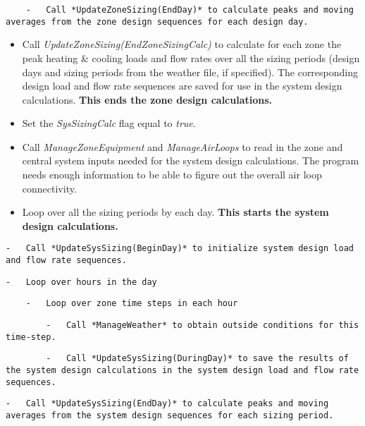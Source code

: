\begin{lstlisting}
    -   Call *UpdateZoneSizing(EndDay)* to calculate peaks and moving averages from the zone design sequences for each design day.
\end{lstlisting}

\begin{itemize}
\item
  Call \emph{UpdateZoneSizing(EndZoneSizingCalc)} to calculate for each zone the peak heating \& cooling loads and flow rates over all the sizing periods (design days and sizing periods from the weather file, if specified). The corresponding design load and flow rate sequences are saved for use in the system design calculations. \textbf{This ends the zone design calculations.}
\item
  Set the \emph{SysSizingCalc} flag equal to \emph{true}.
\item
  Call \emph{ManageZoneEquipment} and \emph{ManageAirLoops} to read in the zone and central system inputs needed for the system design calculations. The program needs enough information to be able to figure out the overall air loop connectivity.
\item
  Loop over all the sizing periods by each day. \textbf{This starts the system design calculations.}
\end{itemize}

\begin{lstlisting}
-   Call *UpdateSysSizing(BeginDay)* to initialize system design load and flow rate sequences.
\end{lstlisting}

\begin{lstlisting}
-   Loop over hours in the day
\end{lstlisting}

\begin{lstlisting}
    -   Loop over zone time steps in each hour
\end{lstlisting}

\begin{lstlisting}
        -   Call *ManageWeather* to obtain outside conditions for this time-step.
\end{lstlisting}

\begin{lstlisting}
        -   Call *UpdateSysSizing(DuringDay)* to save the results of the system design calculations in the system design load and flow rate sequences.
\end{lstlisting}

\begin{lstlisting}
-   Call *UpdateSysSizing(EndDay)* to calculate peaks and moving averages from the system design sequences for each sizing period.
\end{lstlisting}

